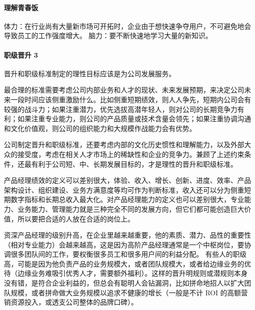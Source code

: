 \documentclass[letterpaper,11pt,english]{sphinxmanual}
\begin{document}
\paragraph{理解青春饭}
\label{\detokenize{chapter_experience/career_path:id18}}
体力：在行业尚有大量新市场可开拓时，企业由于想快速争夺用户，不可避免地会导致员工的工作强度增大。
脑力：要不断快速地学习大量的新知识。%
\begin{footnote}[610]\sphinxAtStartFootnote
{}
%
\end{footnote}


\paragraph{职级晋升 3\sphinxfootnotemark[611]}
\label{\detokenize{chapter_experience/career_path:id19}}%
\begin{footnotetext}[611]\sphinxAtStartFootnote
{}
%
\end{footnotetext}\ignorespaces 
晋升和职级标准制定的理性目标应该是为公司发展服务。

最合理的标准需要考虑公司内部业务和人才的现状、未来发展预期，来决定公司未来一段时间应该侧重激励什么。比如侧重短期绩效，则人人争先，短期内公司会有较强的战斗力；如果注重潜力，优先选拔高潜年轻人，则对公司的长期竞争力有利；如果注重专业能力，则公司的产品质量或技术含量会领先；如果注重协调沟通和文化价值观，则公司的组织能力和大规模作战能力会有优势。

公司制定晋升和职级标准，还要考虑内部的文化历史惯性和理解能力，以及外部大众的接受度，考虑在相关人才市场上的稀缺性和企业的竞争力。兼顾了上述约束条件，还最有利于公司短、中、长期发展目标的，才是理性的晋升和职级标准。

产品经理绩效的定义可以差别很大，体验、收入、增长、创新、进度、效率、产品架构设计、组织建设、业务方满意度等均可作为判断标准，收入还可以分为侧重短期数字指标和长期总收入最大化。对产品经理能力的定义也可以差别很大，专业能力、业务能力、管理能力就是三种完全不同的发展方向，但它们都可能创造巨大价值，所以要把合适的人放在合适的岗位上。

资深产品经理的级别升高，在企业里越来越重要，他的素质、潜力、品性的重要性（相对专业能力）会越来越高，这是因为高阶产品经理通常是一个中枢岗位，要协调很多团队间的工作，要权衡很多员工和很多用户间的利益分配。
有些人的职级高，可能是因为他负责产品的业务规模大，或者团队规模大，或者给边缘业务的优待（边缘业务难吸引优秀人才，需要额外福利）。这样的晋升明规则或潜规则本身没有错，是符合企业利益的，但总会有聪明人会钻漏洞，比如拼命地招人以扩大团队规模，或者拼命做大业务规模以追求不健康的增长（一般是不计
ROI 的高额营销资源投入，或透支公司整体的品牌口碑）。
\end{document}
